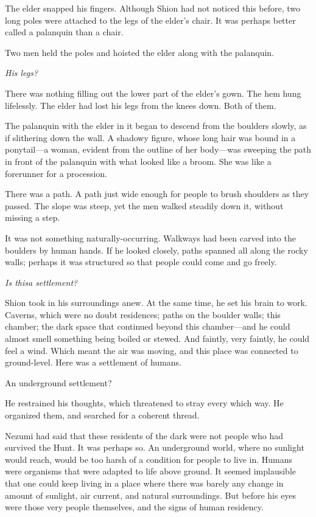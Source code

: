 The elder snapped his fingers. Although Shion had not noticed this
before, two long poles were attached to the legs of the elder's chair.
It was perhaps better called a palanquin than a chair.

Two men held the poles and hoisted the elder along with the palanquin.

\emph{His legs?}

There was nothing filling out the lower part of the elder's gown. The
hem hung lifelessly. The elder had lost his legs from the knees down.
Both of them.

The palanquin with the elder in it began to descend from the boulders
slowly, as if slithering down the wall. A shadowy figure, whose long
hair was bound in a ponytail---a woman, evident from the outline of her
body---was sweeping the path in front of the palanquin with what looked
like a broom. She was like a forerunner for a procession.

There was a path. A path just wide enough for people to brush shoulders
as they passed. The slope was steep, yet the men walked steadily down
it, without missing a step.

It was not something naturally-occurring. Walkways had been carved into
the boulders by human hands. If he looked closely, paths spanned all
along the rocky walls; perhaps it was structured so that people could
come and go freely.

\emph{Is this\el a settlement?}

Shion took in his surroundings anew. At the same time, he set his brain
to work. Caverns, which were no doubt residences; paths on the boulder
walls; this chamber; the dark space that continued beyond this
chamber---and he could almost smell something being boiled or stewed. And
faintly, very faintly, he could feel a wind. Which meant the air was
moving, and this place was connected to ground-level. Here was a
settlement of humans.

An underground settlement?

He restrained his thoughts, which threatened to stray every which way.
He organized them, and searched for a coherent thread.

Nezumi had said that these residents of the dark were not people who had
survived the Hunt. It was perhaps so. An underground world, where no
sunlight would reach, would be too harsh of a condition for people to
live in. Humans were organisms that were adapted to life above ground.
It seemed implausible that one could keep living in a place where there
was barely any change in amount of sunlight, air current, and natural
surroundings. But before his eyes were those very people themselves, and
the signs of human residency.

